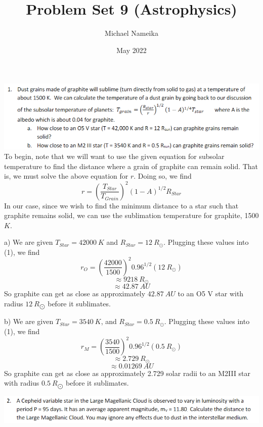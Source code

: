 \documentclass{article}
\title{Problem Set 9 (Astrophysics)}
\author{Michael Nameika}
\date{May 2022}
\begin{document}
\maketitle

\includegraphics[scale = 0.8]{problemset9prob1.PNG}
\newline
To begin, note that we will want to use the given equation for subsolar temperature to find the distance where a grain of graphite can remain solid. That is, we must solve the above equation for $r$. Doing so, we find
\begin{equation}
    r = \left(\frac{T_{Star}}{T_{Grain}}\right)^2(1-A)^{1/2}R_{Star}
\end{equation}
In our case, since we wish to find the minimum distance to a star such that graphite remains solid, we can use the sublimation temperature for graphite, 1500 $K$.


a) We are given $T_{Star} = 42000 \:K$ and $R_{Star} = 12 \: R_{\odot}$. Plugging these values into (1), we find
\[r_{O} = \left(\frac{42000}{1500}\right)^2 0.96^{1/2}(12 \: R_{\odot})\]
\[\approx 9218 \:R_{\odot}\]
\[\approx 42.87 \:AU\]
So graphite can get as close as approximately $42.87 \:AU$ to an O5 V star with radius $12 \: R_{\bigodot}$ before it sublimates.
\newline

b) We are given $T_{Star} = 3540 \:K$, and $R_{Star} = 0.5 \:R_{\odot}$. Plugging these values into (1), we find
\[r_M = \left(\frac{3540}{1500}\right)^2 0.96^{1/2} (0.5 \:R_{\odot})\]
\[\approx 2.729 \: R_{\odot}\]
\[\approx 0.01269 \:AU\]
So graphite can get as close as approximately 2.729 solar radii to an M2III star with radius $0.5 \: R_{\bigodot}$ before it sublimates.
\newline

\includegraphics[scale = 0.8]{problemset9prob2.PNG}
\newline
\end{document}
